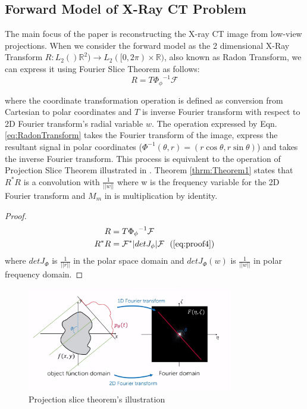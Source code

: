 \documentclass[journal, onecolumn, 11pt]{IEEEtran}
\begin{document}
\subsection{Forward Model of X-Ray CT Problem}
The main focus of the paper is reconstructing the X-ray CT image from low-view projections. When we consider the forward model as the 2 dimensional X-Ray Transform $R: L_2()\mathbb{R}^2) \rightarrow L_2([0,2\pi) \times \mathbb{R})$, also known as Radon Transform, we can express it using Fourier Slice Theorem as follows: 
\begin{equation}
    R = T {\Phi_\phi}^{-1} \mathcal{F}
    \label{eq:RadonTransform}
\end{equation}


where the coordinate transformation operation is defined as conversion from Cartesian to polar coordinates and $T$ is inverse Fourier transform with respect to 2D Fourier transform's radial variable $w$. The operation expressed by Eqn. \ref{eq:RadonTransform} takes the Fourier transform of the image, express the resultant signal in polar coordinates ($\Phi^{-1}(\theta, r) = (r\cos\theta,r\sin\theta)$) and takes the inverse Fourier transform. This process is equivalent to the operation of Projection Slice Theorem illustrated in . Theorem \ref{thrm:Theorem1} states that $R^\ast R$ is a convolution with $\frac{1}{||w||}$ where w is the frequency variable for the 2D Fourier transform and $M_m$ in  is multiplication by identity. 

\begin{proof}
    \begin{align}
        R &= T {\Phi_\phi}^{-1} \mathcal{F} \\
        R^\ast R &=  \mathcal{F}^\ast |det J_\phi| \mathcal{F} \ \ (\ref{eq:proof4}) \\
    \end{align}
    where $det J_\Phi$ is $\frac{1}{||r||}$ in the polar space domain and $det J_\Phi(w)$ is $\frac{1}{||w||}$ in polar frequency domain.
\end{proof}

\begin{figure}[h]
    \centering
    \includegraphics[width=0.8\textwidth]{images/slicethm.png}
    \caption{Projection slice theorem's illustration \cite{kooi_2021}}\label{fig:radonimg}
    \end{figure}
\end{document}

